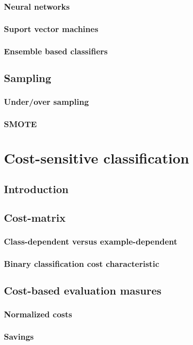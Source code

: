 \documentclass[twoside,openright,titlepage,numbers=noenddot,headinclude,%
               footinclude=true,cleardoublepage=empty,abstractoff,BCOR=5mm,%
               paper=a4,fontsize=11pt,ngerman,american,doublespace]{scrreprt}
\numberwithin{theorem}{chapter}
\numberwithin{definition}{chapter}
\numberwithin{algorithm}{chapter}
\numberwithin{figure}{chapter}
\numberwithin{table}{chapter}
\numberwithin{equation}{chapter}
\begin{document}
			\subsection{Neural networks}
			\subsection{Suport vector machines}
			\subsection{Ensemble based classifiers}
		\section{Sampling}
			\subsection{Under/over sampling}
			\subsection{SMOTE}
		
	\chapter{Cost-sensitive classification}
		\section{Introduction}
		\section{Cost-matrix}
			\subsection{Class-dependent versus example-dependent}
			\subsection{Binary classification cost characteristic}
		\section{Cost-based evaluation masures}
			\subsection{Normalized costs}
			\subsection{Savings}		
\end{document}
